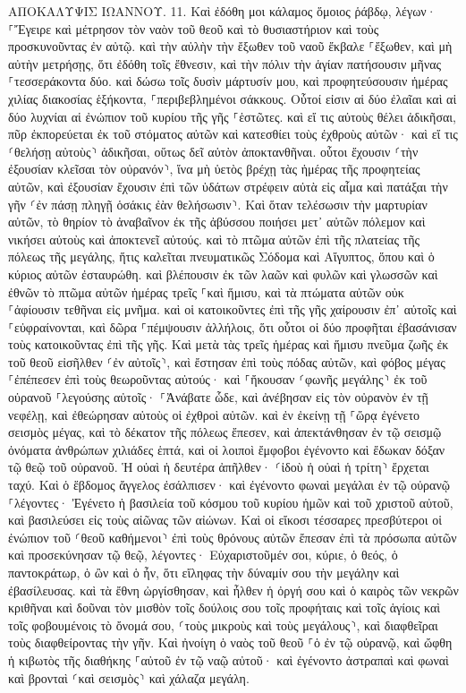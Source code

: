 \documentclass[twoside, 9pt]{extreport}
\begin{document}
ΑΠΟΚΑΛΥΨΙΣ ΙΩΑΝΝΟΥ.
11.
Καὶ ἐδόθη μοι κάλαμος ὅμοιος ῥάβδῳ, λέγων· ⸀Ἔγειρε καὶ μέτρησον τὸν ναὸν τοῦ θεοῦ καὶ τὸ θυσιαστήριον καὶ τοὺς προσκυνοῦντας ἐν αὐτῷ. 
καὶ τὴν αὐλὴν τὴν ἔξωθεν τοῦ ναοῦ ἔκβαλε ⸀ἔξωθεν, καὶ μὴ αὐτὴν μετρήσῃς, ὅτι ἐδόθη τοῖς ἔθνεσιν, καὶ τὴν πόλιν τὴν ἁγίαν πατήσουσιν μῆνας ⸀τεσσεράκοντα δύο. 
καὶ δώσω τοῖς δυσὶν μάρτυσίν μου, καὶ προφητεύσουσιν ἡμέρας χιλίας διακοσίας ἑξήκοντα, ⸀περιβεβλημένοι σάκκους. 
Οὗτοί εἰσιν αἱ δύο ἐλαῖαι καὶ αἱ δύο λυχνίαι αἱ ἐνώπιον τοῦ κυρίου τῆς γῆς ⸀ἑστῶτες. 
καὶ εἴ τις αὐτοὺς θέλει ἀδικῆσαι, πῦρ ἐκπορεύεται ἐκ τοῦ στόματος αὐτῶν καὶ κατεσθίει τοὺς ἐχθροὺς αὐτῶν· καὶ εἴ τις ⸂θελήσῃ αὐτοὺς⸃ ἀδικῆσαι, οὕτως δεῖ αὐτὸν ἀποκτανθῆναι. 
οὗτοι ἔχουσιν ⸂τὴν ἐξουσίαν κλεῖσαι τὸν οὐρανόν⸃, ἵνα μὴ ὑετὸς βρέχῃ τὰς ἡμέρας τῆς προφητείας αὐτῶν, καὶ ἐξουσίαν ἔχουσιν ἐπὶ τῶν ὑδάτων στρέφειν αὐτὰ εἰς αἷμα καὶ πατάξαι τὴν γῆν ⸂ἐν πάσῃ πληγῇ ὁσάκις ἐὰν θελήσωσιν⸃. 
Καὶ ὅταν τελέσωσιν τὴν μαρτυρίαν αὐτῶν, τὸ θηρίον τὸ ἀναβαῖνον ἐκ τῆς ἀβύσσου ποιήσει μετ᾽ αὐτῶν πόλεμον καὶ νικήσει αὐτοὺς καὶ ἀποκτενεῖ αὐτούς. 
καὶ τὸ πτῶμα αὐτῶν ἐπὶ τῆς πλατείας τῆς πόλεως τῆς μεγάλης, ἥτις καλεῖται πνευματικῶς Σόδομα καὶ Αἴγυπτος, ὅπου καὶ ὁ κύριος αὐτῶν ἐσταυρώθη. 
καὶ βλέπουσιν ἐκ τῶν λαῶν καὶ φυλῶν καὶ γλωσσῶν καὶ ἐθνῶν τὸ πτῶμα αὐτῶν ἡμέρας τρεῖς ⸀καὶ ἥμισυ, καὶ τὰ πτώματα αὐτῶν οὐκ ⸀ἀφίουσιν τεθῆναι εἰς μνῆμα. 
καὶ οἱ κατοικοῦντες ἐπὶ τῆς γῆς χαίρουσιν ἐπ᾽ αὐτοῖς καὶ ⸀εὐφραίνονται, καὶ δῶρα ⸀πέμψουσιν ἀλλήλοις, ὅτι οὗτοι οἱ δύο προφῆται ἐβασάνισαν τοὺς κατοικοῦντας ἐπὶ τῆς γῆς. 
Καὶ μετὰ τὰς τρεῖς ἡμέρας καὶ ἥμισυ πνεῦμα ζωῆς ἐκ τοῦ θεοῦ εἰσῆλθεν ⸂ἐν αὐτοῖς⸃, καὶ ἔστησαν ἐπὶ τοὺς πόδας αὐτῶν, καὶ φόβος μέγας ⸀ἐπέπεσεν ἐπὶ τοὺς θεωροῦντας αὐτούς· 
καὶ ⸀ἤκουσαν ⸂φωνῆς μεγάλης⸃ ἐκ τοῦ οὐρανοῦ ⸀λεγούσης αὐτοῖς· ⸀Ἀνάβατε ὧδε, καὶ ἀνέβησαν εἰς τὸν οὐρανὸν ἐν τῇ νεφέλῃ, καὶ ἐθεώρησαν αὐτοὺς οἱ ἐχθροὶ αὐτῶν. 
καὶ ἐν ἐκείνῃ τῇ ⸀ὥρᾳ ἐγένετο σεισμὸς μέγας, καὶ τὸ δέκατον τῆς πόλεως ἔπεσεν, καὶ ἀπεκτάνθησαν ἐν τῷ σεισμῷ ὀνόματα ἀνθρώπων χιλιάδες ἑπτά, καὶ οἱ λοιποὶ ἔμφοβοι ἐγένοντο καὶ ἔδωκαν δόξαν τῷ θεῷ τοῦ οὐρανοῦ. 
Ἡ οὐαὶ ἡ δευτέρα ἀπῆλθεν· ⸂ἰδοὺ ἡ οὐαὶ ἡ τρίτη⸃ ἔρχεται ταχύ. 
Καὶ ὁ ἕβδομος ἄγγελος ἐσάλπισεν· καὶ ἐγένοντο φωναὶ μεγάλαι ἐν τῷ οὐρανῷ ⸀λέγοντες· Ἐγένετο ἡ βασιλεία τοῦ κόσμου τοῦ κυρίου ἡμῶν καὶ τοῦ χριστοῦ αὐτοῦ, καὶ βασιλεύσει εἰς τοὺς αἰῶνας τῶν αἰώνων. 
Καὶ οἱ εἴκοσι τέσσαρες πρεσβύτεροι οἱ ἐνώπιον τοῦ ⸂θεοῦ καθήμενοι⸃ ἐπὶ τοὺς θρόνους αὐτῶν ἔπεσαν ἐπὶ τὰ πρόσωπα αὐτῶν καὶ προσεκύνησαν τῷ θεῷ, 
λέγοντες· Εὐχαριστοῦμέν σοι, κύριε, ὁ θεός, ὁ παντοκράτωρ, ὁ ὢν καὶ ὁ ἦν, ὅτι εἴληφας τὴν δύναμίν σου τὴν μεγάλην καὶ ἐβασίλευσας. 
καὶ τὰ ἔθνη ὠργίσθησαν, καὶ ἦλθεν ἡ ὀργή σου καὶ ὁ καιρὸς τῶν νεκρῶν κριθῆναι καὶ δοῦναι τὸν μισθὸν τοῖς δούλοις σου τοῖς προφήταις καὶ τοῖς ἁγίοις καὶ τοῖς φοβουμένοις τὸ ὄνομά σου, ⸂τοὺς μικροὺς καὶ τοὺς μεγάλους⸃, καὶ διαφθεῖραι τοὺς διαφθείροντας τὴν γῆν. 
Καὶ ἠνοίγη ὁ ναὸς τοῦ θεοῦ ⸀ὁ ἐν τῷ οὐρανῷ, καὶ ὤφθη ἡ κιβωτὸς τῆς διαθήκης ⸀αὐτοῦ ἐν τῷ ναῷ αὐτοῦ· καὶ ἐγένοντο ἀστραπαὶ καὶ φωναὶ καὶ βρονταὶ ⸂καὶ σεισμὸς⸃ καὶ χάλαζα μεγάλη. 
\end{document}
